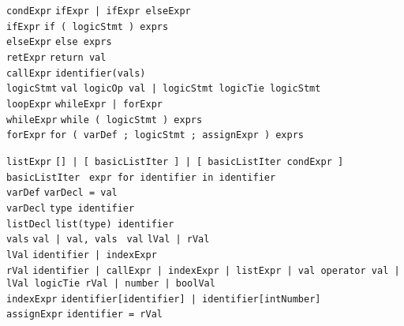\documentclass{article}
\newcommand{\keyword}[1]{\colorbox{light-gray}{\texttt{#1}}}
\newcommand{\code}[1]{\texttt{#1}}
\begin{document}
\code{condExpr} \textrightarrow \code{ifExpr | ifExpr elseExpr} \\
\code{ifExpr} \textrightarrow \code{\keyword{if (} logicStmt \keyword{)} exprs } \\
\code{elseExpr} \textrightarrow \code{\keyword{else} exprs} \\
\code{retExpr} \textrightarrow \code{\keyword{return} val} \\
\code{callExpr} \textrightarrow \code{identifier\keyword{(}vals\keyword{)}} \\
\code{logicStmt} \textrightarrow \code{val logicOp val | logicStmt logicTie logicStmt} \\

\code{loopExpr} \textrightarrow \code{whileExpr | forExpr} \\
\code{whileExpr} \textrightarrow \code{\keyword{while (} logicStmt \keyword{)} exprs} \\
\code{forExpr} \textrightarrow \code{\keyword{for (} varDef \keyword{;} logicStmt \keyword{;} assignExpr \keyword{)} exprs}

\code{listExpr} \textrightarrow \code{\keyword{[]} | \keyword{[} basicListIter \keyword{]} | \keyword{[} basicListIter condExpr \keyword{]} } \\
\code{basicListIter} \textrightarrow \code{ expr \keyword{for} identifier \keyword{in} identifier} \\

\code{varDef} \textrightarrow \code{varDecl \keyword{=} val} \\
\code{varDecl} \textrightarrow \code{type identifier} \\
\code{listDecl} \textrightarrow \code{\keyword{list(}type\keyword{)} identifier} \\
\code{vals} \textrightarrow \code{val | val, vals }
\code{val} \textrightarrow \code{lVal | rVal} \\
\code{lVal} \textrightarrow \code{identifier | indexExpr} \\
\code{rVal} \textrightarrow \code{identifier | callExpr | indexExpr | listExpr | val operator val | lVal logicTie rVal | number | boolVal} \\
\code{indexExpr} \textrightarrow \code{identifier\keyword{[}identifier\keyword{]} | identifier\keyword{[}intNumber\keyword{]}} \\
\code{assignExpr} \textrightarrow \code{identifier \keyword{=} rVal} \\
\end{document}
